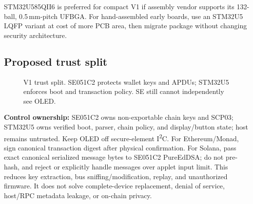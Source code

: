 \documentclass[10pt]{article}
\begin{document}
STM32U585QII6 is preferred for compact V1 if assembly vendor supports its
132-ball, 0.5\,mm-pitch UFBGA. For hand-assembled early boards, use an
STM32U5 LQFP variant at cost of more PCB area, then migrate package without
changing security architecture.

\subsection{Proposed trust split}
\begin{figure}[H]
\centering
{}
\caption{V1 trust split. SE051C2 protects wallet keys and APDUs; STM32U5
enforces boot and transaction policy. SE still cannot independently see OLED.}
\end{figure}

\textbf{Control ownership:} SE051C2 owns non-exportable chain keys and SCP03;
STM32U5 owns verified boot, parser, chain policy, and display/button state;
host remains untrusted. Keep OLED off secure-element I\textsuperscript{2}C.
For Ethereum/Monad, sign canonical transaction digest after physical
confirmation. For Solana, pass exact canonical serialized message bytes to
SE051C2 PureEdDSA; do not pre-hash, and reject or explicitly handle messages
over applet input limit.
This reduces key extraction, bus sniffing/modification, replay, and unauthorized
firmware. It does not solve complete-device replacement, denial of service,
host/RPC metadata leakage, or on-chain privacy.
\end{document}

